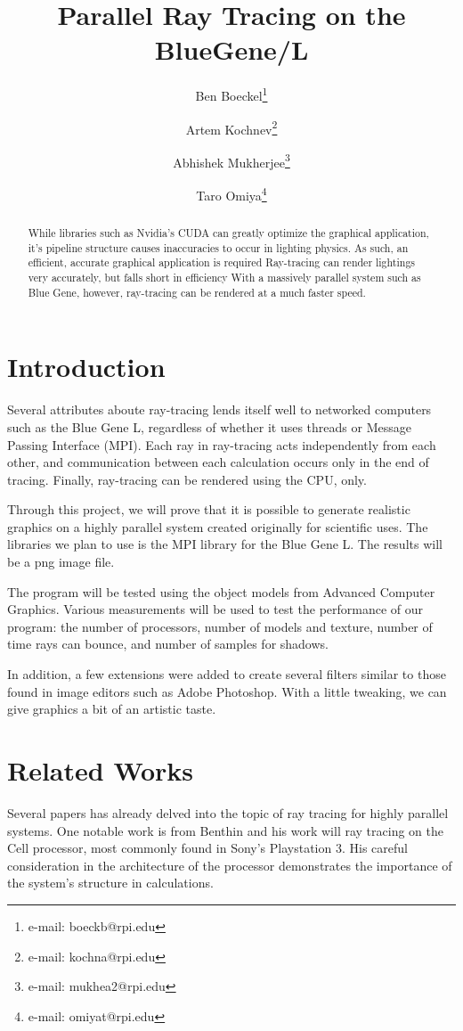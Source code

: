 \documentclass{acmsiggraph}
\title{Parallel Ray Tracing on the BlueGene/L}
\author{%
Ben Boeckel\thanks{e-mail: boeckb@rpi.edu} %
\and Artem Kochnev\thanks{e-mail: kochna@rpi.edu} %
\and Abhishek Mukherjee\thanks{e-mail: mukhea2@rpi.edu} %
\and Taro Omiya\thanks{e-mail: omiyat@rpi.edu}}
\begin{document}
\maketitle


\begin{abstract}
While libraries such as Nvidia's CUDA can greatly optimize the graphical
application, it's pipeline structure causes inaccuracies to occur in lighting
physics.  As such, an efficient, accurate graphical application is required
Ray-tracing can render lightings very accurately, but falls short in efficiency
With a massively parallel system such as Blue Gene, however, ray-tracing can be
rendered at a much faster speed.
\end{abstract}
\keywordlist


\section{Introduction}
Several attributes aboute ray-tracing lends itself well to networked computers
such as the Blue Gene L, regardless of whether it uses threads or Message
Passing Interface (MPI).  Each ray in ray-tracing acts independently from each
other, and communication between each calculation occurs only in the end of
tracing.  Finally, ray-tracing can be rendered using the CPU, only.

Through this project, we will prove that it is possible to generate realistic
graphics on a highly parallel system created originally for scientific uses.
The libraries we plan to use is the MPI library for the Blue Gene L.
The results will be a png image file.

The program will be tested using the object models from Advanced Computer
Graphics.  Various measurements will be used to test the performance of our
program: the number of processors, number of models and texture, number of time
rays can bounce, and number of samples for shadows.

In addition, a few extensions were added to create several filters similar to
those found in image editors such as Adobe Photoshop. With a little tweaking, we
can give graphics a bit of an artistic taste.


\section{Related Works}
Several papers has already delved into the topic of ray tracing for highly
parallel systems.  One notable work is from Benthin and his work will ray
tracing on the Cell processor, most commonly found in Sony's Playstation 3.
His careful consideration in the architecture of the processor demonstrates the
importance of the system's structure in calculations. \cite{benthin2006rtc}
\end{document}
